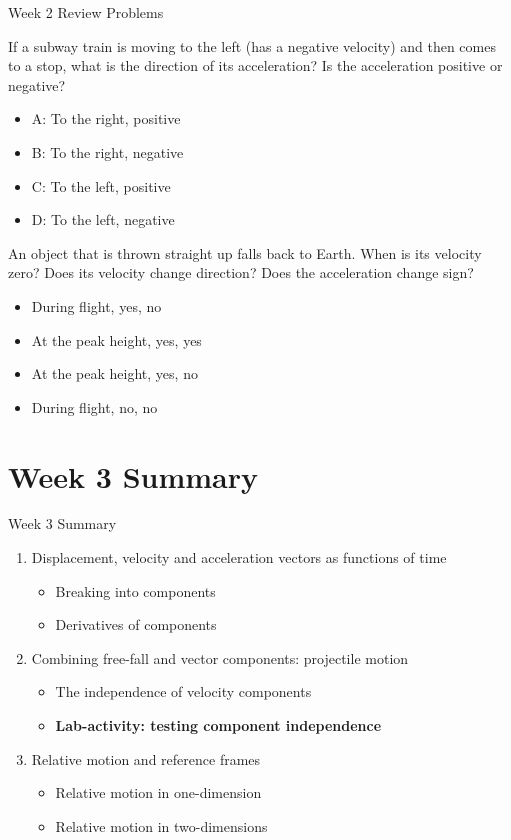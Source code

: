 \documentclass{beamer}
\begin{document}
\begin{frame}{Week 2 Review Problems}
\small
\begin{minipage}[b]{0.45\linewidth}
If a subway train is moving to the left (has a negative velocity) and then comes to a stop, what is the direction of its acceleration? Is the acceleration positive or negative?
\begin{itemize}
\vspace{0.5cm}
\item A: To the right, positive
\item B: To the right, negative
\item C: To the left, positive
\item D: To the left, negative
\end{itemize}
\end{minipage}
\hspace{0.5cm}
\begin{minipage}[b]{0.45\linewidth}
An object that is thrown straight up falls back to Earth.  When is its velocity zero?  Does its velocity change direction?  Does the acceleration change sign?
\begin{itemize}
\item During flight, yes, no
\item At the peak height, yes, yes
\item At the peak height, yes, no
\item During flight, no, no
\end{itemize}
\end{minipage}
\end{frame}

\section{Week 3 Summary}

\begin{frame}{Week 3 Summary}
\begin{enumerate}
\item Displacement, velocity and acceleration vectors \alert{as functions of time}
\begin{itemize}
\item Breaking into components
\item Derivatives of components
\end{itemize}
\item Combining free-fall and vector components: \alert{projectile motion}
\begin{itemize}
\item The independence of velocity components
\item \textbf{Lab-activity: testing component independence}
\end{itemize}
\item Relative motion and reference frames
\begin{itemize}
\item Relative motion in one-dimension
\item Relative motion in two-dimensions
\end{itemize}
\end{enumerate}
\end{frame}
\end{document}
